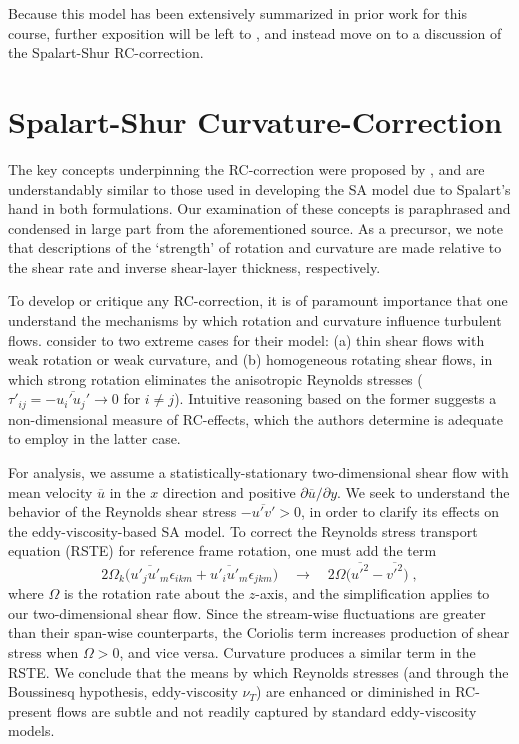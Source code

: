 \documentclass[11pt]{article}
\begin{document}
Because this model has been extensively summarized in prior work for this course, further exposition will be left to \citet{spalart1992}, and instead move on to a discussion of the Spalart-Shur RC-correction.

\section{Spalart-Shur Curvature-Correction} %

The key concepts underpinning the RC-correction were proposed by \citet{spalart1997}, and are understandably similar to those used in developing the SA model due to Spalart's hand in both formulations. Our examination of these concepts is paraphrased and condensed in large part from the aforementioned source. As a precursor, we note that descriptions of the `strength' of rotation and curvature are made relative to the shear rate and inverse shear-layer thickness, respectively.

To develop or critique any RC-correction, it is of paramount importance that one understand the mechanisms by which rotation and curvature influence turbulent flows. \citet{spalart1997} consider to two extreme cases for their model: (a) thin shear flows with weak rotation or weak curvature, and (b) homogeneous rotating shear flows, in which strong rotation eliminates the anisotropic Reynolds stresses ($\tau'_{ij} = -\overline{u_i' u_j'} \rightarrow 0$ for $i \ne j$). Intuitive reasoning based on the former suggests a non-dimensional measure of RC-effects, which the authors determine is adequate to employ in the latter case.

For analysis, we assume a statistically-stationary two-dimensional shear flow with mean velocity $\overline{u}$ in the $x$ direction and positive $\partial \overline{u} / \partial y$. We seek to understand the behavior of the Reynolds shear stress $-\overline{u'v'} > 0$, in order to clarify its effects on the eddy-viscosity-based SA model. To correct the Reynolds stress transport equation (RSTE) for reference frame rotation, one must add the term
\begin{equation}
2 \Omega_k \big( \overline{u'_j u'_m} \epsilon_{ikm} + \overline{u'_i u'_m} \epsilon_{jkm} \big)
\quad \rightarrow \quad
2 \Omega \big( \overline{u'^2} - \overline{v'^2} \big)
\;,
\end{equation}
where $\Omega$ is the rotation rate about the $z$-axis, and the simplification applies to our two-dimensional shear flow. Since the stream-wise fluctuations are greater than their span-wise counterparts, the Coriolis term increases production of shear stress when $\Omega > 0$, and vice versa. Curvature produces a similar term in the RSTE. We conclude that the means by which Reynolds stresses (and through the Boussinesq hypothesis, eddy-viscosity $\nu_T$) are enhanced or diminished in RC-present flows are subtle and not readily captured by standard eddy-viscosity models.
\end{document}
